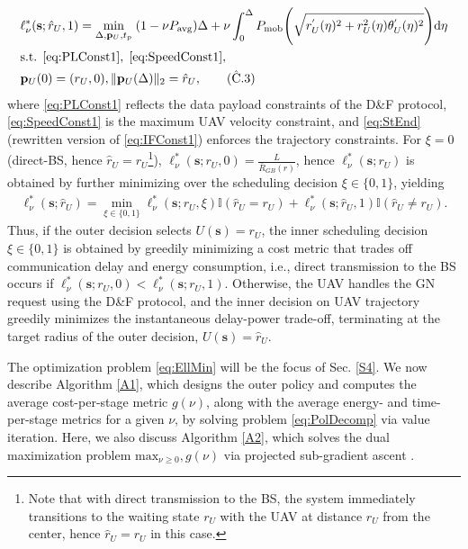 \documentclass[12pt, draftcls, onecolumn]{IEEEtran}
\theoremstyle{plain}
\theoremstyle{definition}
\theoremstyle{remark}
\begin{document}
\begin{align}
    &\ell_{\nu}^{*}(\mathbf{s};\hat r_U,1) = \underset{\Delta,\mathbf{p}_U,t_p}{\mathrm{min}}\; (1-\nu P_{\mathrm{avg}}) \Delta + \nu \int_{0}^{\Delta} P_{\mathrm{mob}}\Bigg( \sqrt{r_U^{'}(\eta)^{2} + r_{U}^{2}(\eta)\theta_{U}^{'}(\eta)^{2}} \Bigg)\mathrm{d} \eta \label{eq:EllMin}\\
    &\mathrm{s.t.}\;\, \text{\ref{eq:PLConst1}},\; \text{\ref{eq:SpeedConst1}},\nonumber\\
    &\mathbf{p}_{U}(0) =(r_U,0), \Vert \mathbf{p}_{U}(\Delta)\Vert_{2} =\hat{r}_U,\tag{$\hat{\text{C}}$.3}\label{eq:StEnd}\
\end{align}
where \ref{eq:PLConst1} reflects the data payload constraints of the D\&F protocol, \ref{eq:SpeedConst1} is the maximum UAV velocity constraint, and \ref{eq:StEnd} (rewritten version of \ref{eq:IFConst1}) enforces the trajectory constraints. For $\xi{=}0$ (direct-BS, hence $\hat{r}_{U}{=}r_{U}$\footnote{Note that with direct transmission to the BS, the system immediately transitions to the waiting state $r_{U}$ with the UAV at distance $r_{U}$ from the center, hence $\hat{r}_{U}{=}r_{U}$ in this case.}), $\ell_{\nu}^{*}(\mathbf{s};r_{U},0){=}\frac{L}{\bar{R}_{GB}(r)}$, hence $\ell_{\nu}^{*}(\mathbf{s};r_{U})$ is obtained by further minimizing over the scheduling decision $\xi{\in}\{0,1\}$, yielding
\begin{align}\label{ellnushatru}
	\ell_{\nu}^* (\mathbf{s}; \hat r_U) = \underset{\xi\in\{0,1\}}{\min} \ell_{\nu}^* (\mathbf{s}; r_U,\xi)\mathbb{I}(\hat r_U = r_U) + \ell_{\nu}^* (\mathbf{s}; \hat r_U, 1)\mathbb{I} (\hat r_U \neq r_U).
\end{align}
Thus, if the outer decision selects $U(\mathbf{s}){=}r_{U}$, the inner scheduling decision $\xi{\in}\{0,1\}$ is obtained by greedily minimizing 
a cost metric that trades off communication delay and energy consumption, i.e., direct transmission to the BS occurs if $\ell_{\nu}^{*}(\mathbf{s}; r_{U},0){<}\ell_{\nu}^{*}(\mathbf{s};r_{U},1)$. Otherwise, the UAV handles the GN request using the D\&F protocol, and the inner decision on UAV trajectory greedily minimizes the instantaneous delay-power trade-off, terminating at the target radius of the outer decision, $U(\mathbf{s}){=}\hat{r}_{U}$.

The optimization problem \eqref{eq:EllMin} will be the focus of Sec. \ref{S4}. We now describe Algorithm \ref{A1}, which designs the outer policy and computes the average cost-per-stage metric $g(\nu)$, along with the average energy- and time-per-stage metrics for a given $\nu$, by solving problem \eqref{eq:PolDecomp} via value iteration. Here, we also discuss Algorithm \ref{A2}, which solves the dual maximization problem $\mathrm{max}_{\nu{\geq}0},g(\nu)$ via projected sub-gradient ascent \cite{SubgradientMethods}.
\end{document}
